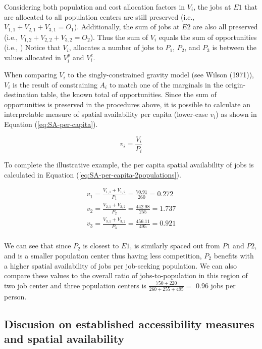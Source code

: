 \documentclass[]{elsarticle} %
\begin{document}
Considering both population and cost allocation factors in \(V_{i}\),
the jobs at \(E1\) that are allocated to all population centers are
still preserved (i.e., \(V_{1,1} + V_{2,1} + V_{3,1} = O_1\)).
Additionally, the sum of jobs at \(E2\) are also all preserved (i.e.,
\(V_{1,2} + V_{2,2} + V_{3,2} = O_2\)). Thus the sum of \(V_{i}\) equals
the sum of opportunities (i.e., ) Notice that \(V_{i}\), allocates a
number of jobs to \(P_1\), \(P_2\), and \(P_3\) is between the values
allocated in \(V^p_{i}\) and \(V^c_{i}\).

When comparing \(V_i\) to the singly-constrained gravity model (see
Wilson (1971)), \(V_i\) is the result of constraining \(A_i\) to match
one of the marginals in the origin-destination table, the known total of
opportunities. Since the sum of opportunities is preserved in the
procedures above, it is possible to calculate an interpretable measure
of spatial availability per capita (lower-case \(v_i\)) as shown in
Equation (\ref{eq:SA-per-capita}).

\begin{equation}
\label{eq:SA-per-capita}
v_i = \frac{V_i}{P_i}
\end{equation}

To complete the illustrative example, the per capita spatial
availability of jobs is calculated in Equation
(\ref{eq:SA-per-capita-2populations}).

\begin{equation}
\label{eq:SA-per-capita-2populations}
\begin{array}{l}
v_{1} = \frac{V_{1,1} + V_{1,2}}{P_1} =  \frac{70.91}{260} = 0.272\\
v_{2} =  \frac{V_{2,1} + V_{2,2}}{P_2} =  \frac{442.98}{255} = 1.737\\
v_{3} =  \frac{V_{3,1} + V_{3,2}}{P_3} =  \frac{456.11}{495} = 0.921\\
\end{array}
\end{equation}

We can see that since \(P_2\) is closest to \(E1\), is similarly spaced
out from \(P1\) and \(P2\), and is a smaller population center thus
having less competition, \(P_2\) benefits with a higher spatial
availability of jobs per job-seeking population. We can also compare
these values to the overall ratio of jobs-to-population in this region
of two job center and three population centers is
\(\frac{750+220}{260+255+495}=\) 0.96 jobs per person.

\hypertarget{discusion-on-established-accessibility-measures-and-spatial-availability}{%
\subsection{Discusion on established accessibility measures and spatial
availability}\label{discusion-on-established-accessibility-measures-and-spatial-availability}}
\end{document}
